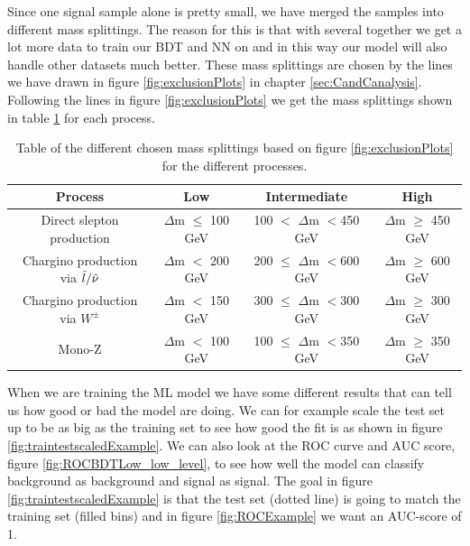 Since one signal sample alone is pretty small, we have merged the samples into different mass splittings. The reason for this is that with several together we get a lot more data to train our BDT and NN on and in this way our model will also handle other datasets much better. These mass splittings are chosen by the lines we have drawn in figure \ref{fig:exclusionPlots} in chapter \ref{sec:CandCanalysis}. Following the lines in figure \ref{fig:exclusionPlots} we get the mass splittings shown in table \ref{tab:massSplittings} for each process.

\begin{table}[H]
    \centering
    \renewcommand{\arraystretch}{1.3}
    \begin{tabular}{c c c c}
    \toprule
        \textbf{Process} & \textbf{Low} & \textbf{Intermediate} & \textbf{High}\\
        \midrule
        \midrule
        Direct slepton production & $\Delta$m $\leq$ 100 GeV & 100 $<$ $\Delta$m $<$450 GeV & $\Delta$m $\geq$ 450 GeV\\
        Chargino production via $\Tilde{l}/\Tilde{\nu}$& $\Delta$m $<$ 200 GeV & 200 $\leq$ $\Delta$m $<$600 GeV & $\Delta$m $\geq$ 600 GeV\\
        Chargino production via $W^\pm$ & $\Delta$m $<$ 150 GeV & 300 $\leq$ $\Delta$m $<$300 GeV & $\Delta$m $\geq$ 300 GeV\\
        Mono-Z & $\Delta$m $<$ 100 GeV & 100 $\leq$ $\Delta$m $<$350 GeV & $\Delta$m $\geq$ 350 GeV\\
        \bottomrule
    \end{tabular}
    \caption{Table of the different chosen mass splittings based on figure \ref{fig:exclusionPlots} for the different processes.}
    \label{tab:massSplittings}
\end{table}


When we are training the ML model we have some different results that can tell us how good or bad the model are doing. We can for example scale the test set up to be as big as the training set to see how good the fit is as shown in figure \ref{fig:traintestscaledExample}. We can also look at the ROC curve and AUC score, figure \ref{fig:ROCBDTLow_low_level}, to see how well the model can classify background as background and signal as signal. The goal in figure \ref{fig:traintestscaledExample} is that the test set (dotted line) is going to match the training set (filled bins) and in figure \ref{fig:ROCExample} we want an AUC-score of 1.


